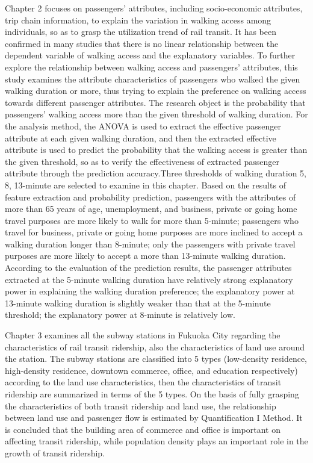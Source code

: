 \documentclass[12pt, twoside, a4paper]{book} %
\begin{document}
Chapter 2 focuses on passengers’ attributes, including socio-economic attributes, trip chain information, to explain the variation in walking access among individuals, so as to grasp the utilization trend of rail transit. It has been confirmed in many studies that there is no linear relationship between the dependent variable of walking access and the explanatory variables. To further explore the relationship between walking access and passengers’ attributes, this study examines the attribute characteristics of passengers who walked the given walking duration or more, thus trying to explain the preference on walking access towards different passenger attributes. The research object is the probability that passengers’ walking access more than the given threshold of walking duration. For the analysis method, the ANOVA is used to extract the effective passenger attribute at each given walking duration, and then the extracted effective attribute is used to predict the probability that the walking access is greater than the given threshold, so as to verify the effectiveness of extracted passenger attribute through the prediction accuracy.Three thresholds of walking duration 5, 8, 13-minute are selected to examine in this chapter. Based on the results of feature extraction and probability prediction, passengers with the attributes of more than 65 years of age, unemployment, and business, private or going home travel purposes are more likely to walk for more than 5-minute; passengers who travel for business, private or going home purposes are more inclined to accept a walking duration longer than 8-minute; only the passengers with private travel purposes are more likely to accept a more than 13-minute walking duration. According to the evaluation of the prediction results, the passenger attributes extracted at the 5-minute walking duration have relatively strong explanatory power in explaining the walking duration preference; the explanatory power at 13-minute walking duration is slightly weaker than that at the 5-minute threshold; the explanatory power at 8-minute is relatively low.

Chapter 3 examines all the subway stations in Fukuoka City regarding the characteristics of rail transit ridership, also the characteristics of land use around the station. The subway stations are classified into 5 types (low-density residence, high-density residence, downtown commerce, office, and education respectively) according to the land use characteristics, then the characteristics of transit ridership are summarized in terms of the 5 types. On the basis of fully grasping the characteristics of both transit ridership and land use, the relationship between land use and passenger flow is estimated by Quantification I Method. It is concluded that the building area of commerce and office is important on affecting transit ridership, while population density plays an important role in the growth of transit ridership.
\end{document}
